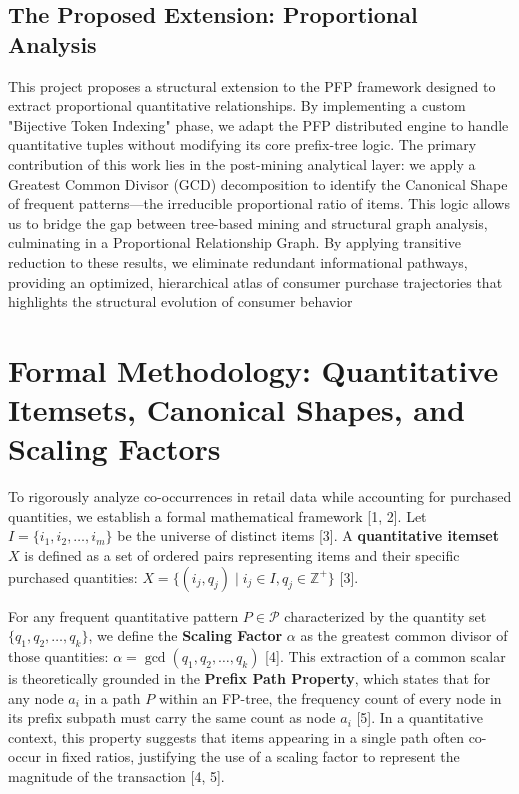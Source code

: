 \documentclass[10pt, twocolumn]{article}
\begin{document}
\subsection{The Proposed Extension: Proportional Analysis}
This project proposes a structural extension to the PFP framework designed to
extract proportional quantitative relationships. By implementing a custom
"Bijective Token Indexing" phase, we adapt the PFP distributed engine to handle
quantitative tuples without modifying its core prefix-tree logic.
The primary contribution of this work lies in the post-mining analytical layer:
we apply a Greatest Common Divisor (GCD) decomposition to identify the
Canonical Shape of frequent patterns—the irreducible proportional ratio of
items.
This logic allows us to bridge the gap between tree-based mining and structural
graph analysis, culminating in a Proportional Relationship Graph.
By applying transitive reduction to these results, we eliminate redundant
informational pathways, providing an optimized, hierarchical atlas of consumer
purchase trajectories that highlights the structural evolution of consumer
behavior

\section{Formal Methodology: Quantitative Itemsets, Canonical Shapes, and
  Scaling Factors}

To rigorously analyze co-occurrences in retail data while accounting for
purchased quantities, we establish a formal mathematical framework [1, 2]. Let
$I = \{i_1, i_2, \dots, i_m\}$ be the universe of distinct items [3]. A
\textbf{quantitative itemset} $X$ is defined as a set of ordered pairs
representing items and their specific purchased quantities: $X = \{ (i_j, q_j)
    \mid i_j \in I, q_j \in \mathbb{Z}^+ \}$ [3].

For any frequent quantitative pattern $P \in \mathcal{P}$ characterized by the
quantity set $\{q_1, q_2, \dots, q_k\}$, we define the \textbf{Scaling Factor}
$\alpha$ as the greatest common divisor of those quantities: $\alpha =
    \gcd(q_1, q_2, \dots, q_k)$ [4]. This extraction of a common scalar is
theoretically grounded in the \textbf{Prefix Path Property}, which states that
for any node $a_i$ in a path $P$ within an FP-tree, the frequency count of
every node in its prefix subpath must carry the same count as node $a_i$ [5].
In a quantitative context, this property suggests that items appearing in a
single path often co-occur in fixed ratios, justifying the use of a scaling
factor to represent the magnitude of the transaction [4, 5].
\end{document}

